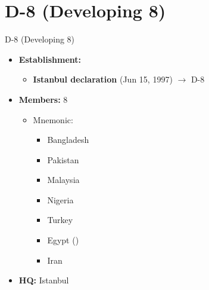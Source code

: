 \documentclass[
  10pt,
  ignorenonframetext,
  progressbar=frametitle]{beamer}
\providecommand{\tightlist}{%
  \setlength{\itemsep}{0pt}\setlength{\parskip}{0pt}}
\begin{document}
\section{D-8 (Developing 8)}
\begin{frame}[allowframebreaks]
{D-8 (Developing 8)}
\protect\hypertarget{d-8-developing-8}{}
\begin{itemize}
\tightlist
\item
  \textbf{Establishment:}

  \begin{itemize}
  \tightlist
  \item
    \textbf{Istanbul declaration} (Jun 15, 1997) \(\rightarrow\) D-8
  \end{itemize}
\item
  \textbf{Members:} 8

  \begin{itemize}
  \tightlist
  \item
    Mnemonic: 

    \begin{itemize}
    \tightlist
    \item
      Bangladesh
    \item
      Pakistan
    \item
      Malaysia
    \item
      Nigeria
    \item
      Turkey
    \item
      Egypt ()
    \item
      Iran
    \end{itemize}
  \end{itemize}
\item
  \textbf{HQ:} Istanbul
\end{itemize}
\end{frame}
\end{document}
